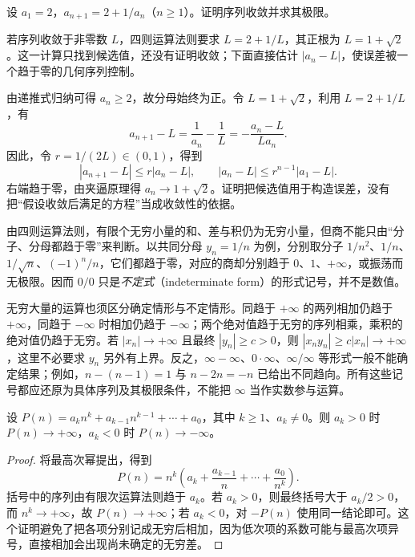 \documentclass[UTF8,12pt,a4paper,fontset=fandol]{ctexbook}
\begin{document}
\begin{example}
\label{ex:recurrence-sequence-geometric-error-bound}
设 $a_1=2$，$a_{n+1}=2+1/a_n$（$n\geq1$）。证明序列收敛并求其极限。
\end{example}

\begin{analyze}
若序列收敛于非零数 $L$，四则运算法则要求 $L=2+1/L$，其正根为 $L=1+\sqrt2$。这一计算只找到候选值，还没有证明收敛；下面直接估计 $|a_n-L|$，使误差被一个趋于零的几何序列控制。
\end{analyze}

\begin{solve}
由递推式归纳可得 $a_n\geq2$，故分母始终为正。令 $L=1+\sqrt2$，利用 $L=2+1/L$，有
\[
    a_{n+1}-L=\frac1{a_n}-\frac1L=-\frac{a_n-L}{La_n}.
\]
因此，令 $r=1/(2L)\in(0,1)$，得到
\[
    |a_{n+1}-L|\leq r|a_n-L|,
    \qquad |a_n-L|\leq r^{n-1}|a_1-L|.
\]
右端趋于零，由夹逼原理得 $a_n\to1+\sqrt2$。证明把候选值用于构造误差，没有把“假设收敛后满足的方程”当成收敛性的依据。
\end{solve}

由四则运算法则，有限个无穷小量的和、差与积仍为无穷小量，但商不能只由“分子、分母都趋于零”来判断。以共同分母 $y_n=1/n$ 为例，分别取分子 $1/n^2$、$1/n$、$1/\sqrt n$、$(-1)^n/n$，它们都趋于零，对应的商却分别趋于 $0$、$1$、$+\infty$，或振荡而无极限。因而 $0/0$ 只是\emph{不定式}（indeterminate form）的形式记号，并不是数值。

无穷大量的运算也须区分确定情形与不定情形。同趋于 $+\infty$ 的两列相加仍趋于 $+\infty$，同趋于 $-\infty$ 时相加仍趋于 $-\infty$；两个绝对值趋于无穷的序列相乘，乘积的绝对值仍趋于无穷。若 $|x_n|\to+\infty$ 且最终 $|y_n|\geq c>0$，则 $|x_ny_n|\geq c|x_n|\to+\infty$，这里不必要求 $y_n$ 另外有上界。反之，$\infty-\infty$、$0\cdot\infty$、$\infty/\infty$ 等形式一般不能确定结果；例如，$n-(n-1)=1$ 与 $n-2n=-n$ 已给出不同趋向。所有这些记号都应还原为具体序列及其极限条件，不能把 $\infty$ 当作实数参与运算。

\begin{proposition}[多项式序列由最高次项决定无穷趋向]
\label{prop:polynomial-sequence-leading-term-infinity}
设 $P(n)=a_kn^k+a_{k-1}n^{k-1}+\cdots+a_0$，其中 $k\geq1$、$a_k\neq0$。则 $a_k>0$ 时 $P(n)\to+\infty$，$a_k<0$ 时 $P(n)\to-\infty$。
\end{proposition}

\begin{proof}
将最高次幂提出，得到
\[
    P(n)=n^k\left(a_k+\frac{a_{k-1}}n+\cdots+\frac{a_0}{n^k}\right).
\]
括号中的序列由有限次运算法则趋于 $a_k$。若 $a_k>0$，则最终括号大于 $a_k/2>0$，而 $n^k\to+\infty$，故 $P(n)\to+\infty$；若 $a_k<0$，对 $-P(n)$ 使用同一结论即可。这个证明避免了把各项分别记成无穷后相加，因为低次项的系数可能与最高次项异号，直接相加会出现尚未确定的无穷差。
\end{proof}
\end{document}
